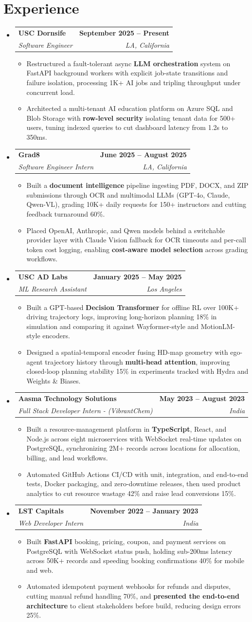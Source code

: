\documentclass[letterpaper,10pt]{article}
\makeatletter
\newcommand{\itemTail}{\vspace{-4pt}}
\newcommand{\sectionGap}{\vspace{-8pt}}
\newcommand{\roleGap}{\vspace{2pt}}
\newcommand{\resumeItem}[1]{\item\small{{#1 \itemTail}}}
\newcommand{\resumeSubheading}[4]{\vspace{-1pt}\item\begin{tabular*}{1.0\textwidth}[t]{l@{\extracolsep{\fill}}r}\textbf{#1} & \textbf{\small #2} \\\textit{\small#3} & \textit{\small #4} \\\end{tabular*}\vspace{-2pt}}
\newcommand{\resumeSubHeadingListStart}{\begin{itemize}[leftmargin=0.0in, label={}]}
\newcommand{\resumeSubHeadingListEnd}{\end{itemize}}
\newcommand{\resumeItemListStart}{\begin{itemize}[leftmargin=0.15in,label=\textbullet,itemsep=3pt,topsep=0pt,parsep=0pt,partopsep=0pt]}
\newcommand{\resumeItemListEnd}{\end{itemize}\vspace{-4pt}}
\makeatother
\begin{document}
\section{Experience}
\resumeSubHeadingListStart
\resumeSubheading{USC Dornsife}{September 2025 -- Present}{Software Engineer}{LA, California}
\resumeItemListStart
\resumeItem{Restructured a fault-tolerant async \textbf{LLM orchestration} system on FastAPI background workers with explicit job-state transitions and failure isolation, processing 1K+ AI jobs and tripling throughput under concurrent load.}
\resumeItem{Architected a multi-tenant AI education platform on Azure SQL and Blob Storage with \textbf{row-level security} isolating tenant data for 500+ users, tuning indexed queries to cut dashboard latency from 1.2s to 350ms.}
\resumeItemListEnd
\roleGap
\resumeSubheading{Grad8}{June 2025 -- August 2025}{Software Engineer Intern}{LA, California}
\resumeItemListStart
\resumeItem{Built a \textbf{document intelligence} pipeline ingesting PDF, DOCX, and ZIP submissions through OCR and multimodal LLMs (GPT-4o, Claude, Qwen-VL), grading 10K+ daily requests for 150+ instructors and cutting feedback turnaround 60\%.}
\resumeItem{Placed OpenAI, Anthropic, and Qwen models behind a switchable provider layer with Claude Vision fallback for OCR timeouts and per-call token cost logging, enabling \textbf{cost-aware model selection} across grading workflows.}
\resumeItemListEnd
\roleGap
\resumeSubheading{USC AD Labs}{January 2025 -- May 2025}{ML Research Assistant}{Los Angeles}
\resumeItemListStart
\resumeItem{Built a GPT-based \textbf{Decision Transformer} for offline RL over 100K+ driving trajectory logs, improving long-horizon planning 18\% in simulation and comparing it against Wayformer-style and MotionLM-style encoders.}
\resumeItem{Designed a spatial-temporal encoder fusing HD-map geometry with ego-agent trajectory history through \textbf{multi-head attention}, improving closed-loop planning stability 15\% in experiments tracked with Hydra and Weights \& Biases.}
\resumeItemListEnd
\roleGap
\resumeSubheading{Aasma Technology Solutions}{May 2023 -- August 2023}{Full Stack Developer Intern - (VibrantChem)}{India}
\resumeItemListStart
\resumeItem{Built a resource-management platform in \textbf{TypeScript}, React, and Node.js across eight microservices with WebSocket real-time updates on PostgreSQL, synchronizing 2M+ records across locations for allocation, billing, and lead workflows.}
\resumeItem{Automated GitHub Actions CI/CD with unit, integration, and end-to-end tests, Docker packaging, and zero-downtime releases, then used product analytics to cut resource wastage 42\% and raise lead conversions 15\%.}
\resumeItemListEnd
\roleGap
\resumeSubheading{LST Capitals}{November 2022 -- January 2023}{Web Developer Intern}{India}
\resumeItemListStart
\resumeItem{Built \textbf{FastAPI} booking, pricing, coupon, and payment services on PostgreSQL with WebSocket status push, holding sub-200ms latency across 50K+ records and speeding booking confirmations 40\% for mobile and web.}
\resumeItem{Automated idempotent payment webhooks for refunds and disputes, cutting manual refund handling 70\%, and \textbf{presented the end-to-end architecture} to client stakeholders before build, reducing design errors 25\%.}
\resumeItemListEnd
\resumeSubHeadingListEnd
\sectionGap
\end{document}
